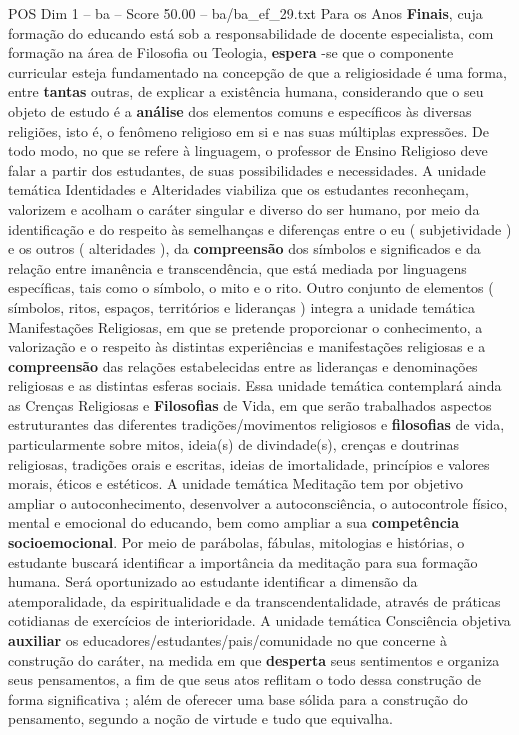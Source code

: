 \begin{textsample}{POS Dim 1 – ba – Score 50.00 – ba/ba\_ef\_29.txt}
Para os Anos \textbf{Finais}, cuja formação do educando está sob a responsabilidade de docente especialista, com formação na área de Filosofia ou Teologia, \textbf{espera} -se que o componente curricular esteja fundamentado na concepção de que a religiosidade é uma forma, entre \textbf{tantas} outras, de explicar a existência humana, considerando que o seu objeto de estudo é a \textbf{análise} dos elementos comuns e específicos às diversas religiões, isto é, o fenômeno religioso em si e nas suas múltiplas expressões.
De todo modo, no que se refere à linguagem, o professor de Ensino Religioso deve falar a partir dos estudantes, de suas possibilidades e necessidades.
A unidade temática Identidades e Alteridades viabiliza que os estudantes reconheçam, valorizem e acolham o caráter singular e diverso do ser humano, por meio da identificação e do respeito às semelhanças e diferenças entre o eu ( subjetividade ) e os outros ( alteridades ), da \textbf{compreensão} dos símbolos e significados e da relação entre imanência e transcendência, que está mediada por linguagens específicas, tais como o símbolo, o mito e o rito.
Outro conjunto de elementos ( símbolos, ritos, espaços, territórios e lideranças ) integra a unidade temática Manifestações Religiosas, em que se pretende proporcionar o conhecimento, a valorização e o respeito às distintas experiências e manifestações religiosas e a \textbf{compreensão} das relações estabelecidas entre as lideranças e denominações religiosas e as distintas esferas sociais.
Essa unidade temática contemplará ainda as Crenças Religiosas e \textbf{Filosofias} de Vida, em que serão trabalhados aspectos estruturantes das diferentes tradições/movimentos religiosos e \textbf{filosofias} de vida, particularmente sobre mitos, ideia(s) de divindade(s), crenças e doutrinas religiosas, tradições orais e escritas, ideias de imortalidade, princípios e valores morais, éticos e estéticos.
A unidade temática Meditação tem por objetivo ampliar o autoconhecimento, desenvolver a autoconsciência, o autocontrole físico, mental e emocional do educando, bem como ampliar a sua \textbf{competência} \textbf{socioemocional}.
Por meio de parábolas, fábulas, mitologias e histórias, o estudante buscará identificar a importância da meditação para sua formação humana.
Será oportunizado ao estudante identificar a dimensão da atemporalidade, da espiritualidade e da transcendentalidade, através de práticas cotidianas de exercícios de interioridade.
A unidade temática Consciência objetiva \textbf{auxiliar} os educadores/estudantes/pais/comunidade no que concerne à construção do caráter, na medida em que \textbf{desperta} seus sentimentos e organiza seus pensamentos, a fim de que seus atos reflitam o todo dessa construção de forma significativa ; além de oferecer uma base sólida para a construção do pensamento, segundo a noção de virtude e tudo que equivalha.

\end{textsample}
